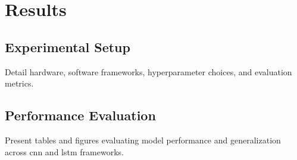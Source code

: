 \chapter{Results}
\label{ch:results}

\section{Experimental Setup}
Detail hardware, software frameworks, hyperparameter choices, and evaluation metrics.

\section{Performance Evaluation}
Present tables and figures evaluating model performance and generalization across \gls{cnn} and \gls{lstm} frameworks.